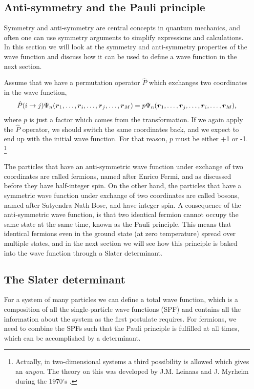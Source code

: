 \subsection{Anti-symmetry and the Pauli principle} \label{sec:symmetry}
Symmetry and anti-symmetry are central concepts in quantum mechanics, and often one can use symmetry arguments to simplify expressions and calculations. In this section we will look at the symmetry and anti-symmetry properties of the wave function and discuss how it can be used to define a wave function in the next section.

Assume that we have a permutation operator $\hat{P}$ which exchanges two coordinates in the wave function,
\begin{equation}
\hat{P}(i\rightarrow j)\Psi_n(\boldsymbol{{r}}_1,\hdots,\boldsymbol{{r}}_i,\hdots,\boldsymbol{{r}}_j,\hdots,\boldsymbol{{r}}_M)=p\Psi_n(\boldsymbol{{r}}_1,\hdots,\boldsymbol{{r}}_j,\hdots,\boldsymbol{{r}}_i,\hdots,\boldsymbol{{r}}_M),
\end{equation}
where $p$ is just a factor which comes from the transformation. If we again apply the $\hat{P}$ operator, we should switch the same coordinates back, and we expect to end up with the initial wave function. For that reason, $p$ must be either +1 or -1. \footnote{Actually, in two-dimensional systems a third possibility is allowed which gives an \textit{anyon}. The theory on this was developed by J.M. Leinaas and J. Myrheim during the 1970's \cite{leinaas_one_1977}.}

The particles that have an anti-symmetric wave function under exchange of two coordinates are called fermions, named after Enrico Fermi, and as discussed before they have half-integer spin. On the other hand, the particles that have a symmetric wave function under exchange of two coordinates are called bosons, named after Satyendra Nath Bose, and have integer spin. A consequence of the anti-symmetric wave function, is that two identical fermion cannot occupy the same state at the same time, known as the Pauli principle. This means that identical fermions even in the ground state (at zero temperature) spread over multiple states, and in the next section we will see how this principle is baked into the wave function through a Slater determinant. 

\subsection{The Slater determinant} \label{sec:slater}
For a system of many particles we can define a total wave function, which is a composition of all the single-particle wave functions (SPF) and contains all the information about the system as the first postulate requires. For fermions, we need to combine the SPFs such that the Pauli principle is fulfilled at all times, which can be accomplished by a determinant. 

